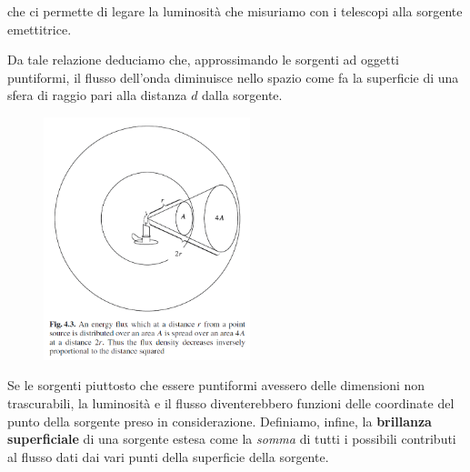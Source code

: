 che ci permette di legare la luminosità che misuriamo con i telescopi alla sorgente emettitrice.

Da tale relazione deduciamo che, approssimando le sorgenti ad oggetti puntiformi, il flusso dell'onda diminuisce nello spazio come fa la superficie di una sfera di raggio pari alla distanza $d$ dalla sorgente.

\begin{figure}[H]
    \centering
    \includegraphics[width=6cm]{immagini/flusso_radiazione.png}
\end{figure}

Se le sorgenti piuttosto che essere puntiformi avessero delle dimensioni non trascurabili, la luminosità e il flusso diventerebbero funzioni delle coordinate del punto della sorgente preso in considerazione. Definiamo, infine, la \textbf{brillanza superficiale} di una sorgente estesa come la \textit{somma} di tutti i possibili contributi al flusso dati dai vari punti della superficie della sorgente.